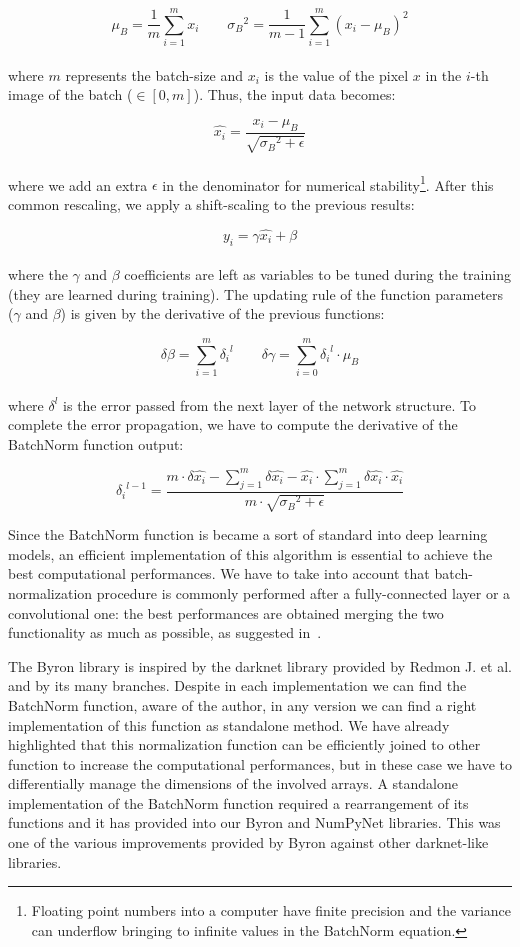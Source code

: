 \documentclass{standalone}
\begin{document}
$$
\mu_B = \frac{1}{m}\sum_{i=1}^{m}x_i \quad\quad {\sigma_B}^2 = \frac{1}{m-1}\sum_{i=1}^{m}(x_i - \mu_B)^2
$$
\\
where $m$ represents the batch-size and $x_i$ is the value of the pixel $x$ in the $i$-th image of the batch ($\in[0, m]$).
Thus, the input data becomes:

$$
\hat{x_i} = \frac{x_i - \mu_B}{\sqrt{{\sigma_B}^2 + \epsilon}}
$$
\\
where we add an extra $\epsilon$ in the denominator for numerical stability\footnote{
  Floating point numbers into a computer have finite precision and the variance can underflow bringing to infinite values in the BatchNorm equation.
}.
After this common rescaling, we apply a shift-scaling to the previous results:

$$
y_i = \gamma\hat{x_i} + \beta
$$
\\
where the $\gamma$ and $\beta$ coefficients are left as variables to be tuned during the training (they are learned during training).
The updating rule of the function parameters ($\gamma$ and $\beta$) is given by the derivative of the previous functions:

$$
\delta\beta = \sum_{i=1}^{m}{\delta_i}^l \quad\quad \delta\gamma = \sum_{i=0}^{m} {\delta_i}^l \cdot \mu_B
$$
\\
where $\delta^l$ is the error passed from the next layer of the network structure.
To complete the error propagation, we have to compute the derivative of the BatchNorm function output:

$$
{\delta_i}^{l-1} = \frac{{m}\cdot \delta\hat{x_i} - \sum_{j=1}^{m}\delta\hat{x_i} - \hat{x_i} \cdot \sum_{j=1}^{m} \delta\hat{x_i} \cdot \hat{x_i}}{m \cdot \sqrt{{\sigma_B}^2 + \epsilon} }
$$

Since the BatchNorm function is became a sort of standard into deep learning models, an efficient implementation of this algorithm is essential to achieve the best computational performances.
We have to take into account that batch-normalization procedure is commonly performed after a fully-connected layer or a convolutional one: the best performances are obtained merging the two functionality as much as possible, as suggested in~\cite{AlexeyAB}.

The \textsf{Byron} library is inspired by the \textsf{darknet} library provided by Redmon J. et al. and by its many branches.
Despite in each implementation we can find the BatchNorm function, aware of the author, in any version we can find a right implementation of this function as standalone method.
We have already highlighted that this normalization function can be efficiently joined to other function to increase the computational performances, but in these case we have to differentially manage the dimensions of the involved arrays.
A standalone implementation of the BatchNorm function required a rearrangement of its functions and it has provided into our \textsf{Byron} and \textsf{NumPyNet} libraries.
This was one of the various improvements provided by \textsf{Byron} against other \textsf{darknet}-like libraries.
\end{document}
